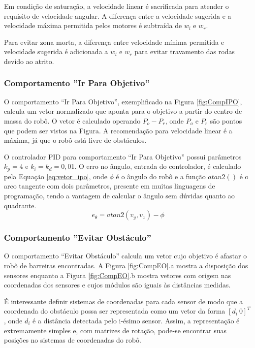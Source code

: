 	Em condição de saturação, a velocidade linear é sacrificada para atender o requisito 
	de velocidade angular. A diferença entre a velocidade sugerida e a velocidade máxima 
	permitida pelos motores é subtraída de $w_l$ e $w_r$. 
	
	Para evitar zona morta, a diferença entre velocidade mínima permitida e velocidade 
	sugerida é adicionada a $w_l$ e $w_r$ para evitar travamento das rodas devido ao atrito.
	
		\subsubsection{Comportamento ''Ir Para Objetivo''}
		
		O comportamento ``Ir Para Objetivo'', exemplificado na Figura \ref{fig:CompIPO}, calcula 
		um vetor normalizado que aponta para o objetivo a partir do centro de massa do robô. O 
		vetor é calculado operando $P_o - P_r$, onde $P_o$ e $P_r$ são pontos que podem ser 
		vistos na Figura. A recomendação para velocidade linear é a máxima, já que o robô 
		está livre de obstáculos.
		
		
		
		O controlador PID para comportamento ``Ir Para Objetivo'' possui parâmetros $k_p = 4$ e 
		$k_i = k_d = 0,01$. O erro no ângulo, entrada do controlador, é calculado pela Equação
		\ref{eq:vetor_ipo}, onde $\phi$ é o ângulo do robô e a função $atan2()$ é o arco 
		tangente com dois parâmetros, presente em muitas linguagens de programação, 
		tendo a vantagem de calcular o ângulo sem dúvidas quanto ao quadrante.
		\begin{equation}
			\label{eq:vetor_ipo}
			e_\theta = atan2(v_y, v_x) - \phi
		\end{equation}
		
		\subsubsection{Comportamento ''Evitar Obstáculo''}
		
		O comportamento ``Evitar Obstáculo'' calcula um vetor cujo objetivo é afastar o robô de 
		barreiras encontradas. A Figura \ref{fig:CompEO}.a mostra a disposição dos 
		sensores enquanto a Figura \ref{fig:CompEO}.b mostra vetores com origem nas coordenadas dos 
		sensores e cujos módulos são iguais às distâncias medidas. 
		
		
		
		É interessante definir sistemas de coordenadas para cada sensor de modo que a coordenada
		do obstáculo possa ser representada como um vetor da forma $[d_i\ 0]^T$, onde $d_i$ é a 
		distância detectada pelo i-ésimo sensor. Assim, a representação é extremamente simples
		e, com matrizes de rotação, pode-se encontrar suas posições no sistemas de coordenadas
		do robô. 
		
